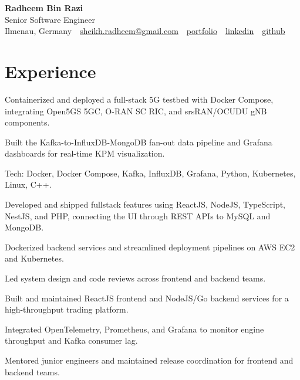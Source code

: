 \documentclass[10pt,a4paper]{resume}
\makeatletter
\newcommand{\Portfolio}{https://radheem.github.io/my-cv}
\newcommand{\PortfolioText}{portfolio}
\newcommand{\GitHub}{https://github.com/radheem}
\newcommand{\LinkedIn}{https://www.linkedin.com/in/radheem-razi}
\newcommand{\Email}{sheikh.radheem@gmail.com}
\makeatother
\begin{document}
\begin{center}
  {\huge\bfseries Radheem Bin Razi}\\[3pt]
  {\large Senior Software Engineer}\\[6pt]
  \small
  Ilmenau, Germany \,\textbar\,
  \href{mailto:\Email}{\Email} \,\textbar\,
  \href{\Portfolio}{\PortfolioText} \,\textbar\,
  \href{\LinkedIn}{linkedin} \,\textbar\,
  \href{\GitHub}{github}
\end{center}
\vspace{2pt}

\section{Experience}

\bullets
  \item Containerized and deployed a full-stack 5G testbed with Docker Compose, integrating Open5GS 5GC, O-RAN SC RIC, and srsRAN/OCUDU gNB components.
  \item Built the Kafka-to-InfluxDB-MongoDB fan-out data pipeline and Grafana dashboards for real-time KPM visualization.
  \item Tech: Docker, Docker Compose, Kafka, InfluxDB, Grafana, Python, Kubernetes, Linux, C++.
\bulletsend
\vspace{1.5pt}
\bullets
  \item Developed and shipped fullstack features using ReactJS, NodeJS, TypeScript, NestJS, and PHP, connecting the UI through REST APIs to MySQL and MongoDB.
  \item Dockerized backend services and streamlined deployment pipelines on AWS EC2 and Kubernetes.
  \item Led system design and code reviews across frontend and backend teams.
\bulletsend
\vspace{1.5pt}
\bullets
  \item Built and maintained ReactJS frontend and NodeJS/Go backend services for a high-throughput trading platform.
  \item Integrated OpenTelemetry, Prometheus, and Grafana to monitor engine throughput and Kafka consumer lag.
  \item Mentored junior engineers and maintained release coordination for frontend and backend teams.
\bulletsend
\vspace{1.5pt}
\end{document}
